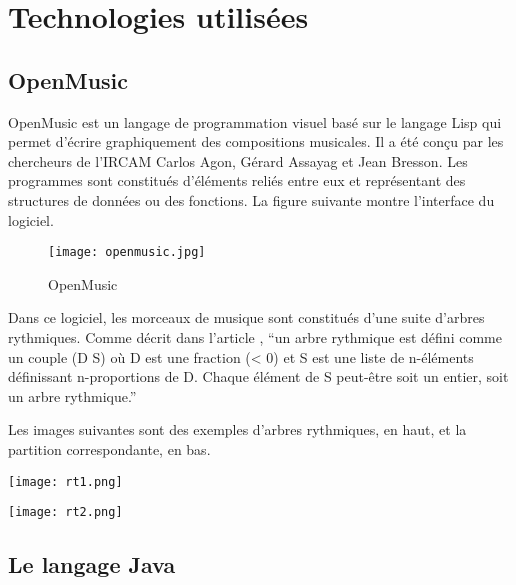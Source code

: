 \section{Technologies utilisées}

\subsection{OpenMusic}

OpenMusic \cite{openmusic} est un langage de programmation visuel basé sur le langage Lisp qui permet d'écrire graphiquement des compositions musicales. Il a été conçu par les chercheurs de l'IRCAM Carlos Agon, Gérard Assayag et Jean Bresson. Les programmes sont constitués d'éléments reliés entre eux et représentant des structures de données ou des fonctions. La figure suivante montre l'interface du logiciel.


\begin{figure}[!h] %
\centering
\texttt{[image: openmusic.jpg]}\\[1cm]
\caption{OpenMusic}
\label{OpenMusic}
\end{figure}

\par
Dans ce logiciel, les morceaux de musique sont constitués d'une suite d'arbres rythmiques. Comme décrit dans l'article \cite{agon}, \enquote{un arbre rythmique est défini comme un couple (D S) où D est une fraction (< 0) et S est une liste de n-éléments définissant n-proportions de D. Chaque élément de S peut-être soit un entier, soit un arbre rythmique.}

\par
Les images suivantes sont des exemples d'arbres rythmiques, en haut, et la partition correspondante, en bas.


\begin{minipage}[c]{.46\linewidth}
  \centering
  \texttt{[image: rt1.png]}\\[1cm]
\end{minipage}
\hfill
\begin{minipage}[c]{.46\linewidth}
  \centering
  \texttt{[image: rt2.png]}\\[1cm]
\end{minipage}



\subsection{Le langage Java}


